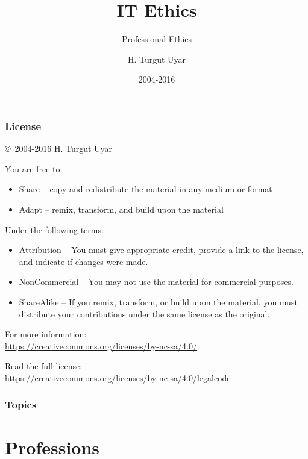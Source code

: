 \documentclass[dvipsnames]{beamer}
\title{IT Ethics}
\subtitle{Professional Ethics}
\author{H. Turgut Uyar}
\date{2004-2016}
\theoremstyle{plain}
\begin{document}
\begin{frame}
  \titlepage
\end{frame}

\begin{frame}
  \frametitle{License}

  \hfill
  \copyright~2004-2016 H. Turgut Uyar

  \vfill
  \begin{footnotesize}
    You are free to:
    \begin{itemize}
      \itemsep0em
      \item Share -- copy and redistribute the material in any medium or format
      \item Adapt -- remix, transform, and build upon the material
    \end{itemize}

    Under the following terms:
    \begin{itemize}
      \itemsep0em
      \item Attribution -- You must give appropriate credit, provide a link to
        the license, and indicate if changes were made.

      \item NonCommercial -- You may not use the material for commercial
        purposes.

      \item ShareAlike -- If you remix, transform, or build upon the material,
        you must distribute your contributions under the same license as the
        original.
    \end{itemize}
  \end{footnotesize}

  \begin{small}
    For more information:\\
    \url{https://creativecommons.org/licenses/by-nc-sa/4.0/}

    \smallskip
    Read the full license:\\
    \url{https://creativecommons.org/licenses/by-nc-sa/4.0/legalcode}
  \end{small}
\end{frame}

\begin{frame}
  \frametitle{Topics}
  \tableofcontents
\end{frame}

\section{Professions}
\end{document}
